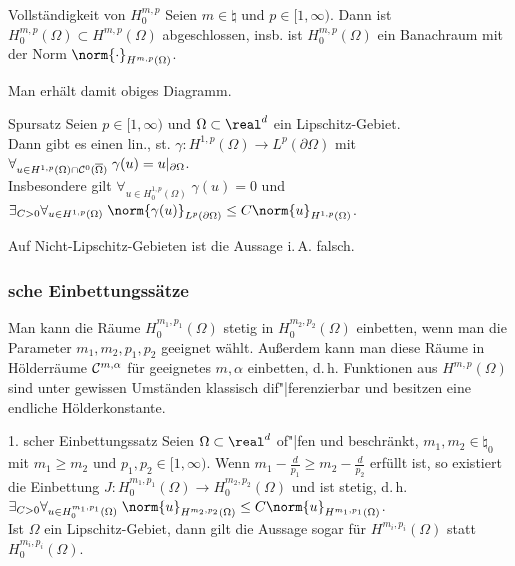 \begin{Satz}{Vollständigkeit von $H^{m,p}_0$}
    Seien $m \in \natural$ und $p \in [1, \infty)$.
    Dann ist $H^{m,p}_0(\Omega) \subset H^{m,p}(\Omega)$ abgeschlossen,
    insb. ist $H^{m,p}_0(\Omega)$ ein Banachraum mit der Norm $\norm{\cdot}_{H^{m,p}(\Omega)}$.
\end{Satz}

\begin{Bem}
    Man erhält damit obiges Diagramm.
\end{Bem}

\linie

\begin{Satz}{Spursatz}
    Seien $p \in [1, \infty)$ und $\Omega \subset \real^d$ ein Lipschitz-Gebiet.\\
    Dann gibt es einen lin., st. 
    $\gamma\colon H^{1,p}(\Omega) \to L^p(\partial\Omega)$ mit
    $\forall_{u \in H^{1,p}(\Omega) \cap \mathcal{C}^0(\overline{\Omega})}\;
    \gamma(u) = u|_{\partial\Omega}$.\\
    Insbesondere gilt $\forall_{u \in H^{1,p}_0(\Omega)}\; \gamma(u) = 0$ und
    $\exists_{C > 0} \forall_{u \in H^{1,p}(\Omega)}\;
    \norm{\gamma(u)}_{L^p(\partial\Omega)} \le C \norm{u}_{H^{1,p}(\Omega)}$.
\end{Satz}

\begin{Bem}
    Auf Nicht-Lipschitz-Gebieten ist die Aussage i.\,A. falsch.
\end{Bem}

\pagebreak

\subsubsection{%
    sche Einbettungssätze%
}

\begin{Bem}
    Man kann die Räume $H_0^{m_1,p_1}(\Omega)$ stetig in $H_0^{m_2,p_2}(\Omega)$ einbetten,
    wenn man die Parameter $m_1, m_2, p_1, p_2$ geeignet wählt.
    Außerdem kann man diese Räume in Hölderräume $\mathcal{C}^{m,\alpha}$ für geeignetes $m, \alpha$
    einbetten,
    d.\,h. Funktionen aus $H^{m,p}(\Omega)$ sind unter gewissen Umständen klassisch
    dif"|ferenzierbar und besitzen eine endliche Hölderkonstante.
\end{Bem}

\begin{Satz}{1. scher Einbettungssatz}
    Seien $\Omega \subset \real^d$ of"|fen und beschränkt,
    $m_1, m_2 \in \natural_0$ mit $m_1 \ge m_2$ und
    $p_1, p_2 \in [1, \infty)$.
    Wenn $m_1 - \frac{d}{p_1} \ge m_2 - \frac{d}{p_2}$ erfüllt ist,
    so existiert die Einbettung $J\colon H_0^{m_1,p_1}(\Omega) \to H_0^{m_2,p_2}(\Omega)$
    und ist stetig,
    d.\,h. $\exists_{C > 0} \forall_{u \in H_0^{m_1,p_1}(\Omega)}\;
    \norm{u}_{H^{m_2,p_2}(\Omega)} \le C \norm{u}_{H^{m_1,p_1}(\Omega)}$.\\
    Ist $\Omega$ ein Lipschitz-Gebiet, dann gilt die Aussage sogar für
    $H^{m_i,p_i}(\Omega)$ statt $H_0^{m_i,p_i}(\Omega)$.
\end{Satz}

